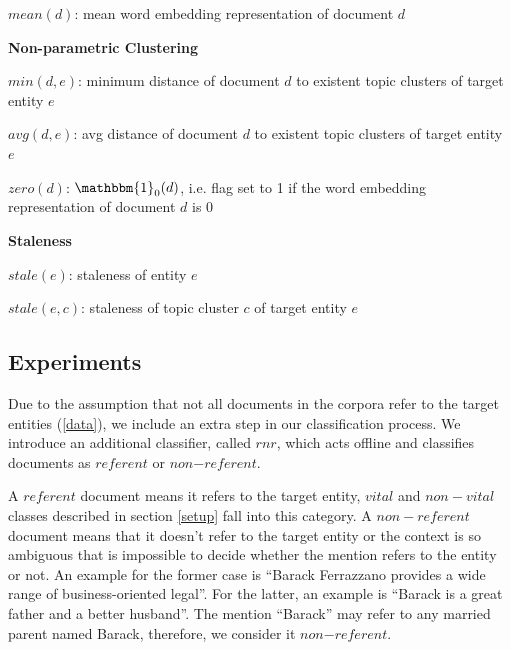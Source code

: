 \documentclass{article}
\begin{document}
\begin{itemize*}
    \begin{itemize*}
        \item $mean(d)$: mean word embedding representation of document $d$
    \end{itemize*}
  \item \textbf{Non-parametric Clustering}
    \begin{itemize*}
        \item $min(d,e)$: minimum distance of document $d$ to existent topic clusters of target entity $e$
        \item $avg(d,e)$: avg distance of document $d$ to existent topic clusters of target entity $e$
        \item $zero(d)$: $\mathbbm{1}_{0}{(d)}$, i.e. flag set to 1 if the word embedding representation of document $d$ is $0$
    \end{itemize*}
  \item \textbf{Staleness}
    \begin{itemize*}
        \item $stale(e)$: staleness of entity $e$
        \item $stale(e,c)$: staleness of topic cluster $c$ of target entity $e$
    \end{itemize*}
\end{itemize*}


\subsection{Experiments}
\label{expe}

Due to the assumption that not all documents in the corpora refer to the target entities (\ref{data}), we include an extra step in our classification process. We introduce an additional classifier, called $rnr$, which acts offline and classifies documents as $referent$ or $non\mathord{-}referent$.

A $referent$ document means it refers to the target entity, $vital$ and $non-vital$ classes described in section \ref{setup} fall into this category.
A $non-referent$ document means that it doesn't refer to the target entity or the context is so ambiguous that is impossible to decide whether the mention refers to the entity or not. An example for the former case is ``Barack Ferrazzano provides a wide range of business-oriented legal''. For the latter, an example is ``Barack is a great father and a better husband''. The mention ``Barack'' may refer to any married parent named Barack, therefore, we consider it $non\mathord{-}referent$.
\end{document}
